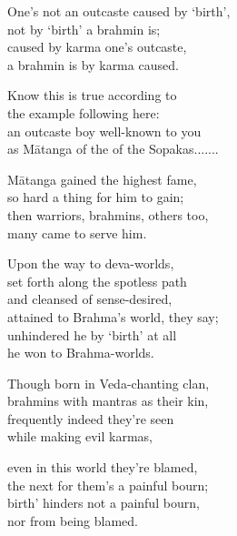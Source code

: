 \begin{MyDescription}{}
One's not an outcaste caused by `birth',\\
not by `birth' a brahmin is;\\
caused by karma one's outcaste,\\
a brahmin is by karma caused.
\end{MyDescription}      

\begin{MyDescription}{}
Know this is true according to\\
the example following here:\\
an outcaste boy well-known to you\\
as M\=atanga of the of the Sopakas.......
\end{MyDescription}      

\begin{MyDescription}{}
M\=atanga gained the highest fame,\\
so hard a thing for him to gain;\\
then warriors, brahmins, others too,\\
many came to serve him.
\end{MyDescription}      

\begin{MyDescription}{}
Upon the way to deva-worlds,\\
set forth along the spotless path\\
and cleansed of sense-desired,\\
attained to Brahma's world, they say;\\
unhindered he by `birth' at all\\
he won to Brahma-worlds.
\end{MyDescription}      
   
\begin{MyDescription}{}
Though born in Veda-chanting clan,\\
brahmins with mantras as their kin,\\
frequently indeed they're seen\\
while making evil karmas,
\end{MyDescription}       

\begin{MyDescription}{}
even in this world they're blamed,\\
the next for them's a painful bourn;\\
birth' hinders not a painful bourn,\\
nor from being blamed.
\end{MyDescription}    

